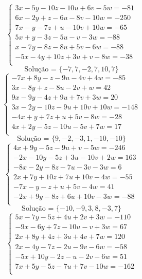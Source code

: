 \documentclass[12pt,oneside,a4paper]{article}
\begin{document}
\vspace{\baselineskip}
\begin{equation*}
\begin{cases}
3x-5y-10z-10u+6v-5w=-81 \\
6x-2y+z-6u-8v-10w=-250 \\
7x-y-7z+u-10v+10w=-65 \\
5x+y-3z-5u-v-3w=-88 \\
x-7y-8z-8u+5v-6w=-88 \\
-5x-4y+10z+3u+v-8w=-38 \\
\end{cases}
\end{equation*}
\begin{equation*}
\text{Solução = }\{-7,7,-2,7,10,7\}
\end{equation*}
\vspace{\baselineskip}
\begin{equation*}
\begin{cases}
-7x+8y-z-9u-4v+4w=-85 \\
3x-8y+z-8u-2v+w=42 \\
9x-9y-4z+9u+7v+3w=20 \\
3x-2y-10z-9u+10v+10w=-148 \\
-4x+y+7z+u+5v-8w=-28 \\
4x+2y-5z-10u-5v+7w=17 \\
\end{cases}
\end{equation*}
\begin{equation*}
\text{Solução = }\{9,-2,-3,1,-10,-10\}
\end{equation*}
\vspace{\baselineskip}
\begin{equation*}
\begin{cases}
4x+9y-5z-9u+v-5w=-246 \\
-2x-10y-5z+3u-10v+2w=163 \\
-8x-2y-8z-7u-3v-3w=6 \\
2x+7y+10z+7u+10v-4w=-55 \\
-7x-y-z+u+5v-4w=41 \\
-2x+9y-8z+6u+10v-3w=-88 \\
\end{cases}
\end{equation*}
\begin{equation*}
\text{Solução = }\{-10,-9,3,8,-3,7\}
\end{equation*}
\vspace{\baselineskip}
\begin{equation*}
\begin{cases}
5x-7y-5z+4u+2v+3w=-110 \\
-9x-6y+7z-10u-v+3w=67 \\
2x+8y+4z+3u+4v+7w=120 \\
2x-4y-7z-2u-9v-6w=-58 \\
-5x+10y-2z-u-2v-6w=51 \\
7x+5y-5z-7u+7v-10w=-162 \\
\end{cases}
\end{equation*}
\end{document}
